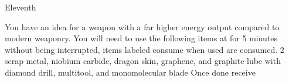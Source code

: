 \documentclass[greennotebook]{guildcamp3} %
\begin{document}
\begin{page}{Eleventh}
	
	You have an idea for a weapon with a far higher energy output compared to modern weaponry.
	You will need to use the following items at \sSciWorkbench{} for 5 minutes without being interrupted, items labeled consume when used are consumed.
	2 scrap metal, niobium carbide, dragon skin, graphene, and graphite lube with diamond drill, multitool, and monomolecular blade
	Once done receive \iUpgradedTechGun{}
	
\end{page}




\endnotebook
\end{document}
